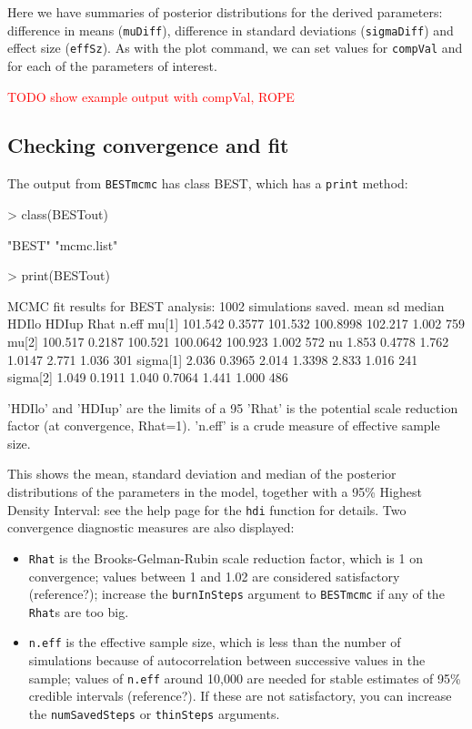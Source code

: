 \documentclass[a4paper]{article}
\begin{document}
Here we have summaries of posterior distributions for the derived parameters: difference in means (\texttt{muDiff}), difference in standard deviations (\texttt{sigmaDiff}) and effect size (\texttt{effSz}). As with the plot command, we can set values for \texttt{compVal} and  for each of the parameters of interest.

\textcolor{red}{TODO show example output with compVal, ROPE}


\subsection{Checking convergence and fit}
\label{subsec:checks2g}

The output from \texttt{BESTmcmc} has class BEST, which has a \texttt{print} method:
\begin{Schunk}
\begin{Sinput}
> class(BESTout)
\end{Sinput}
\begin{Soutput}
[1] "BEST"      "mcmc.list"
\end{Soutput}
\begin{Sinput}
> print(BESTout)
\end{Sinput}
\begin{Soutput}
MCMC fit results for BEST analysis:
1002 simulations saved.
            mean     sd  median    HDIlo   HDIup  Rhat n.eff
mu[1]    101.542 0.3577 101.532 100.8998 102.217 1.002   759
mu[2]    100.517 0.2187 100.521 100.0642 100.923 1.002   572
nu         1.853 0.4778   1.762   1.0147   2.771 1.036   301
sigma[1]   2.036 0.3965   2.014   1.3398   2.833 1.016   241
sigma[2]   1.049 0.1911   1.040   0.7064   1.441 1.000   486

'HDIlo' and 'HDIup' are the limits of a 95% HDI credible interval.
'Rhat' is the potential scale reduction factor (at convergence, Rhat=1).
'n.eff' is a crude measure of effective sample size.
\end{Soutput}
\end{Schunk}

This shows the mean, standard deviation and median of the posterior distributions of the parameters in the model, together with a 95\% Highest Density Interval: see the help page for the \texttt{hdi} function for details.
Two convergence diagnostic measures are also displayed:

\begin{itemize}
  \item \texttt{Rhat} is the Brooks-Gelman-Rubin scale reduction factor, which is 1 on convergence; values between 1 and 1.02 are considered satisfactory (reference?); increase the \texttt{burnInSteps} argument to \texttt{BESTmcmc} if any of the \texttt{Rhat}s are too big.
  \item \texttt{n.eff} is the effective sample size, which is less than the number of simulations because of autocorrelation between successive values in the sample; values of \texttt{n.eff} around 10,000 are needed for stable estimates of 95\% credible intervals (reference?). If these are not satisfactory, you can increase the \texttt{numSavedSteps} or \texttt{thinSteps} arguments.
\end{itemize}
\end{document}
